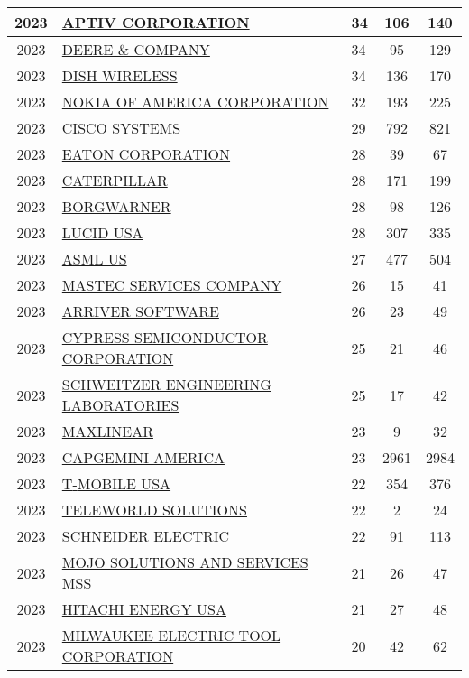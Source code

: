\documentclass{article}%
\begin{document}
\begin{longtable}{c|p{20em}|p{5em}|c|c}
\hline%
2023&\hyperref[subsec:APTIVCORPORATION]{APTIV CORPORATION}&34&106&140\\%
\hline%
2023&\hyperref[subsec:DEERECOMPANY]{DEERE \& COMPANY}&34&95&129\\%
\hline%
2023&\hyperref[subsec:DISHWIRELESS]{DISH WIRELESS}&34&136&170\\%
\hline%
2023&\hyperref[subsec:NOKIAOFAMERICACORPORATION]{NOKIA OF AMERICA CORPORATION}&32&193&225\\%
\hline%
2023&\hyperref[subsec:CISCOSYSTEMS]{CISCO SYSTEMS}&29&792&821\\%
\hline%
2023&\hyperref[subsec:EATONCORPORATION]{EATON CORPORATION}&28&39&67\\%
\hline%
2023&\hyperref[subsec:CATERPILLAR]{CATERPILLAR}&28&171&199\\%
\hline%
2023&\hyperref[subsec:BORGWARNER]{BORGWARNER}&28&98&126\\%
\hline%
2023&\hyperref[subsec:LUCIDUSA]{LUCID USA}&28&307&335\\%
\hline%
2023&\hyperref[subsec:ASMLUS]{ASML US}&27&477&504\\%
\hline%
2023&\hyperref[subsec:MASTECSERVICESCOMPANY]{MASTEC SERVICES COMPANY}&26&15&41\\%
\hline%
2023&\hyperref[subsec:ARRIVERSOFTWARE]{ARRIVER SOFTWARE}&26&23&49\\%
\hline%
2023&\hyperref[subsec:CYPRESSSEMICONDUCTORCORPORATION]{CYPRESS SEMICONDUCTOR CORPORATION}&25&21&46\\%
\hline%
2023&\hyperref[subsec:SCHWEITZERENGINEERINGLABORATORIES]{SCHWEITZER ENGINEERING LABORATORIES}&25&17&42\\%
\hline%
2023&\hyperref[subsec:MAXLINEAR]{MAXLINEAR}&23&9&32\\%
\hline%
2023&\hyperref[subsec:CAPGEMINIAMERICA]{CAPGEMINI AMERICA}&23&2961&2984\\%
\hline%
2023&\hyperref[subsec:T{-}MOBILEUSA]{T{-}MOBILE USA}&22&354&376\\%
\hline%
2023&\hyperref[subsec:TELEWORLDSOLUTIONS]{TELEWORLD SOLUTIONS}&22&2&24\\%
\hline%
2023&\hyperref[subsec:SCHNEIDERELECTRIC]{SCHNEIDER ELECTRIC}&22&91&113\\%
\hline%
2023&\hyperref[subsec:MOJOSOLUTIONSANDSERVICESMSS]{MOJO SOLUTIONS AND SERVICES MSS}&21&26&47\\%
\hline%
2023&\hyperref[subsec:HITACHIENERGYUSA]{HITACHI ENERGY USA}&21&27&48\\%
\hline%
2023&\hyperref[subsec:MILWAUKEEELECTRICTOOLCORPORATION]{MILWAUKEE ELECTRIC TOOL CORPORATION}&20&42&62\\%

\end{longtable}
\end{document}

